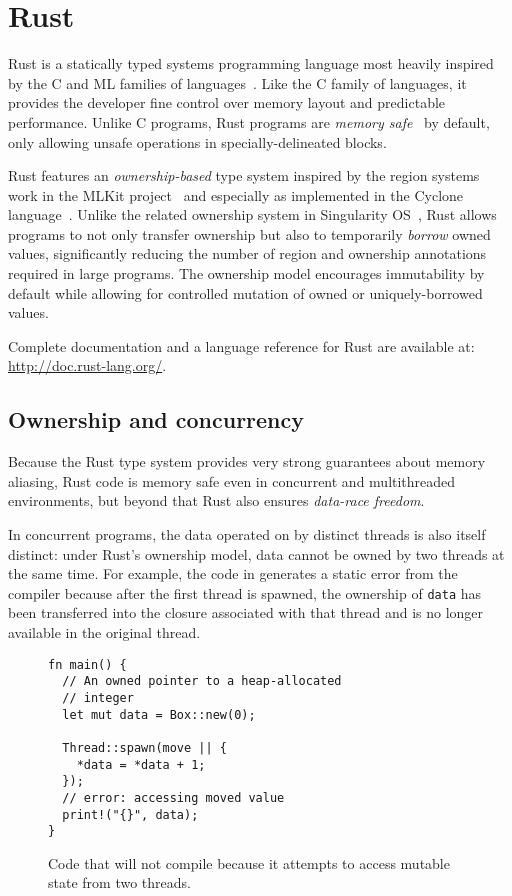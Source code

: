 
\section{Rust}
\label{sec:rust}

Rust is a statically typed systems programming language most heavily inspired by the C
and ML families of languages~\cite{RUST}.
Like the C family of languages, it provides the developer fine control over memory layout
and predictable performance.
Unlike C programs, Rust programs are \emph{memory safe}~\cite{memory-safety} by default,
only allowing unsafe operations in specially-delineated blocks.

Rust features an \emph{ownership-based} type system inspired by the region systems work in the
MLKit project~\cite{mlkit} and especially as implemented in the Cyclone language~\cite{cyclone}.
Unlike the related ownership system in Singularity OS~\cite{singularity}, Rust allows programs to
not only transfer ownership but also to temporarily \emph{borrow} owned values, significantly
reducing the number of region and ownership annotations required in large programs.
The ownership model encourages immutability by default while allowing for controlled
mutation of owned or uniquely-borrowed values.

Complete documentation and a language reference for Rust are available at: \url{http://doc.rust-lang.org/}.

\subsection{Ownership and concurrency}
Because the Rust type system provides very strong guarantees about memory aliasing,
Rust code is memory safe even in concurrent and multithreaded environments,
but beyond that Rust also ensures \emph{data-race freedom}.

In concurrent programs, the data operated on by distinct threads is also itself distinct:
under Rust's ownership model, data cannot be owned by two threads at the same time.
For example, the code in  generates a static error from the compiler because
after the first thread is spawned, the ownership of \lstinline{data} has been transferred into the
closure associated with that thread and is no longer available in the original thread.
\begin{figure}
\begin{lstlisting}
fn main() {
  // An owned pointer to a heap-allocated
  // integer
  let mut data = Box::new(0);

  Thread::spawn(move || {
    *data = *data + 1;
  });
  // error: accessing moved value
  print!("{}", data);
}
\end{lstlisting}
  \caption{Code that will not compile because it attempts to access mutable state from two threads.}
  \label{fig:bad-concurrency}
\end{figure}

